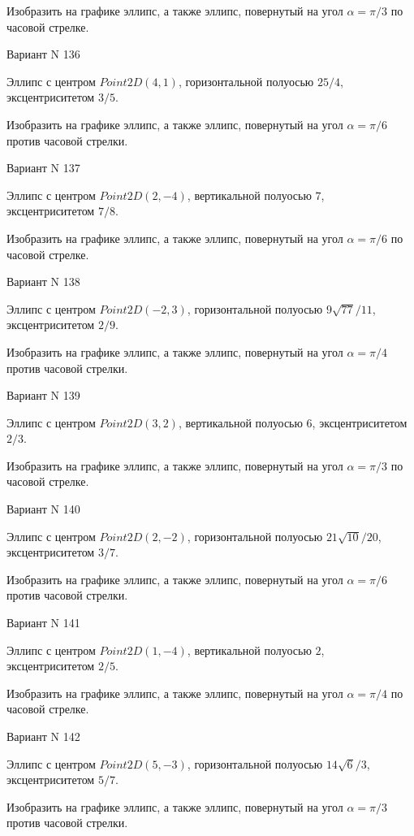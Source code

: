 \documentclass[11pt]{report}
\begin{document}
    Изобразить на графике эллипс, а также эллипс, повернутый на угол $\alpha = $$\pi / 3$ по часовой стрелке.

Вариант N 136

Эллипс с центром $Point2D\left(4, 1\right)$, горизонтальной полуосью $25 / 4$, эксцентриситетом $3 / 5$.

    Изобразить на графике эллипс, а также эллипс, повернутый на угол $\alpha = $$\pi / 6$ против часовой стрелки.

Вариант N 137

Эллипс с центром $Point2D\left(2, -4\right)$, вертикальной полуосью $7$, эксцентриситетом $7 / 8$.

    Изобразить на графике эллипс, а также эллипс, повернутый на угол $\alpha = $$\pi / 6$ по часовой стрелке.

Вариант N 138

Эллипс с центром $Point2D\left(-2, 3\right)$, горизонтальной полуосью $9 \sqrt{77} / 11$, эксцентриситетом $2 / 9$.

    Изобразить на графике эллипс, а также эллипс, повернутый на угол $\alpha = $$\pi / 4$ против часовой стрелки.

Вариант N 139

Эллипс с центром $Point2D\left(3, 2\right)$, вертикальной полуосью $6$, эксцентриситетом $2 / 3$.

    Изобразить на графике эллипс, а также эллипс, повернутый на угол $\alpha = $$\pi / 3$ по часовой стрелке.

Вариант N 140

Эллипс с центром $Point2D\left(2, -2\right)$, горизонтальной полуосью $21 \sqrt{10} / 20$, эксцентриситетом $3 / 7$.

    Изобразить на графике эллипс, а также эллипс, повернутый на угол $\alpha = $$\pi / 6$ против часовой стрелки.

Вариант N 141

Эллипс с центром $Point2D\left(1, -4\right)$, вертикальной полуосью $2$, эксцентриситетом $2 / 5$.

    Изобразить на графике эллипс, а также эллипс, повернутый на угол $\alpha = $$\pi / 4$ по часовой стрелке.

Вариант N 142

Эллипс с центром $Point2D\left(5, -3\right)$, горизонтальной полуосью $14 \sqrt{6} / 3$, эксцентриситетом $5 / 7$.

    Изобразить на графике эллипс, а также эллипс, повернутый на угол $\alpha = $$\pi / 3$ против часовой стрелки.
\end{document}
